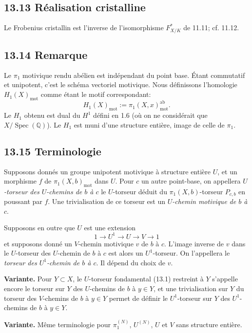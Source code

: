 \documentclass[12pt,a4paper]{article}
\theoremstyle{plain}
\theoremstyle{definition}
\theoremstyle{remark}
\DeclareMathOperator{\Spec}{Spec}
\newcommand{\bQ}{\mathbb{Q}}
\newcommand{\mot}{\mathrm{mot}}
\begin{document}
\subsection*{13.13 Réalisation cristalline}

Le Frobenius cristallin est l'inverse de l'isomorphisme $F_{X/K}^*$ de 11.11; cf. 11.12.

\subsection*{13.14 Remarque}

Le $\pi_1$ motivique rendu abélien est indépendant du point base. Étant commutatif et unipotent, c'est le schéma vectoriel motivique. Nous définissons l'homologie $H_1(X)_{\mot}$ comme étant le motif correspondant:
\begin{equation}\label{eq:13.14.1}
H_1(X)_{\mot} := \pi_1(X,x)_{\mot}^{\mathrm{ab}}.
\end{equation}
Le $H_1$ obtenu est dual du $H^1$ défini en 1.6 (où on ne considérait que $X/\Spec(\bQ)$). Le $H_1$ est muni d'une structure entière, image de celle de $\pi_1$.

\subsection*{13.15 Terminologie}

Supposons donnés un groupe unipotent motivique à structure entière $U$, et un morphisme $f$ de $\pi_1(X,b)_{\mot}$ dans $U$. Pour $c$ un autre point-base, on appellera \emph{$U$-torseur des $U$-chemins de $b$ à $c$} le $U$-torseur déduit du $\pi_1(X,b)$-torseur $P_{c,b}$ en poussant par $f$. Une trivialisation de ce torseur est un \emph{$U$-chemin motivique de $b$ à $c$}.

Supposons en outre que $U$ est une extension
\[
1 \to U^1 \to U \to V \to 1
\]
et supposons donné un $V$-chemin motivique $v$ de $b$ à $c$. L'image inverse de $v$ dans le $U$-torseur des $U$-chemin de $b$ à $c$ est alors un $U^1$-torseur. On l'appellera le \emph{torseur des $U^1$-chemin de $b$ à $c$}. Il dépend du choix de $v$.

\textbf{Variante.} Pour $Y \subset X$, le $U$-torseur fondamental (13.1) restreint à $Y$ s'appelle encore le torseur sur $Y$ des $U$-chemins de $b$ à $y \in Y$, et une trivialisation sur $Y$ du torseur des $V$-chemins de $b$ à $y \in Y$ permet de définir le $U^1$-torseur sur $Y$ des $U^1$-chemins de $b$ à $y \in Y$.

\textbf{Variante.} Même terminologie pour $\pi_1^{(N)}$, $U^{(N)}$, $U$ et $V$ sans structure entière.
\end{document}
